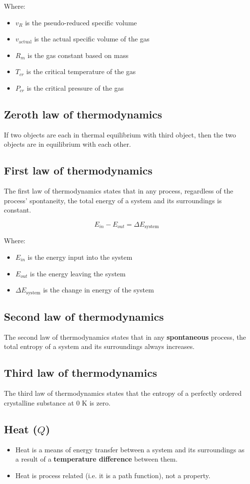 \documentclass[11pt]{article}
\begin{document}
Where:
\begin{itemize}
\item \(v_R\) is the pseudo-reduced specific volume
\item \(v_{\text{actual}}\) is the actual specific volume of the gas
\item \(R_m\) is the gas constant based on mass
\item \(T_{cr}\) is the critical temperature of the gas
\item \(P_{cr}\) is the critical pressure of the gas
\end{itemize}
\subsection{Zeroth law of thermodynamics}
\label{sec:org8720c9a}
If two objects are each in thermal equilibrium with third object, then the two objects are in equilibrium with each other.
\subsection{First law of thermodynamics}
\label{sec:orge8f20b4}
The first law of thermodynamics states that in any process, regardless of the process' spontaneity, the total energy of a system and its surroundings is constant.

\[E_{in} - E_{out} = \Delta E_{\text{system}}\]

Where:
\begin{itemize}
\item \(E_{in}\) is the energy input into the system
\item \(E_{out}\) is the energy leaving the system
\item \(\Delta E_{\text{system}}\) is the change in energy of the system
\end{itemize}
\subsection{Second law of thermodynamics}
\label{sec:orged6389e}
The second law of thermodynamics states that in any \textbf{spontaneous} process, the total entropy of a system and its surroundings always increases.
\subsection{Third law of thermodynamics}
\label{sec:org46af33a}
The third law of thermodynamics states that the entropy of a perfectly ordered crystalline substance at 0 K is zero.
\subsection{Heat (\(Q\))}
\label{sec:org820afd8}
\begin{itemize}
\item Heat is a means of energy transfer between a system and its surroundings as a result of a \textbf{temperature difference} between them.
\item Heat is process related (i.e. it is a path function), not a property.
\end{itemize}
\end{document}

